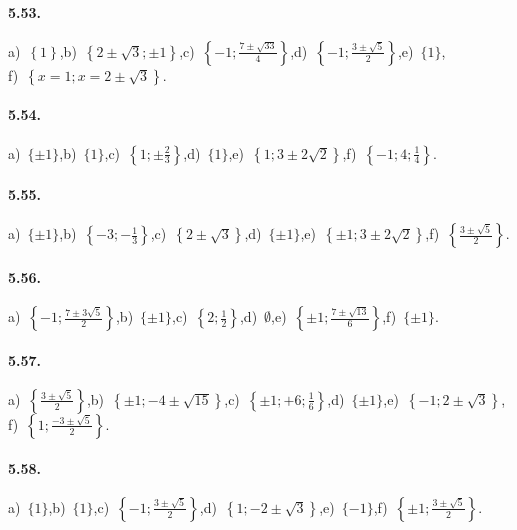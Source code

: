 \paragraph{5.53.} a)~$\left\{1\right\}$,\quad b)~$\left\{2\pm \sqrt 3;\pm 1\right\}$,\quad c)~$\left\{-1;\frac{7\pm\sqrt{33}} 4\right\}$,\quad d)~$\left\{-1;\frac{3\pm\sqrt 5} 2 \right\}$,\quad e)~$\{1\}$,\protect\\ \quad f)~$\left\{x=1;x=2\pm\sqrt 3\right\}$.

\paragraph{5.54.} a)~$\{\pm 1\}$,\quad b)~$\{1\}$,\quad c)~$\left\{1;\pm\frac 2 3\right\}$,\quad d)~$\{1\}$,\quad e)~$\left\{1;3\pm 2\sqrt 2\right\}$,\quad f)~$\left\{-1;4;\frac 1 4\right\}$.

\paragraph{5.55.} a)~$\{\pm 1\}$,\quad b)~$\left\{-3;-\frac 1 3\right\}$,\quad c)~$\left\{2\pm\sqrt 3\right\}$,\quad d)~$\{\pm 1\}$,\quad e)~$\left\{\pm 1;3\pm 2\sqrt 2\right\}$,\quad f)~$\left\{\frac{3\pm\sqrt 5} 2\right\}$.

\paragraph{5.56.} a)~$\left\{-1;\frac{7\pm 3\sqrt 5} 2\right\}$,\quad b)~$\{\pm 1\}$,\quad c)~$\left\{2;\frac 1 2\right\}$,\quad d)~$\emptyset$,\quad e)~$\left\{\pm 1;\frac{7\pm \sqrt{13}} 6\right\}$,\quad f)~$\{\pm 1\}$.

\paragraph{5.57.} a)~$\left\{\frac{3\pm\sqrt 5} 2\right\}$,\quad b)~$\left\{\pm 1;-4\pm \sqrt{15}\right\}$,\quad c)~$\left\{\pm 1;+6;\frac 1 6\right\}$,\quad d)~$\{\pm 1\}$,\quad e)~$\left\{-1;2\pm\sqrt 3\right\}$,\protect\\ \quad f)~$\left\{1;\frac{-3\pm\sqrt 5} 2\right\}$.

\paragraph{5.58.} a)~$\{1\}$,\quad b)~$\{1\}$,\quad c)~$\left\{-1;\frac{3\pm\sqrt 5} 2\right\}$,\quad d)~$\left\{1;-2\pm\sqrt 3\right\}$,\quad e)~$\{-1\}$,\quad f)~$\left\{\pm 1;\frac{3\pm \sqrt 5} 2\right\}$.

